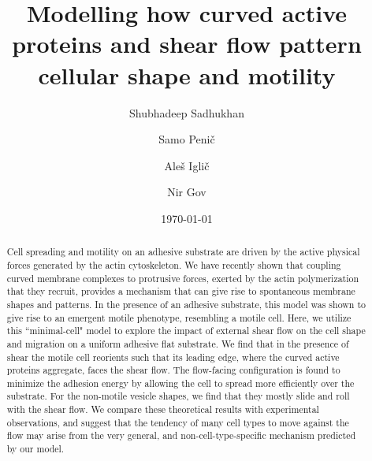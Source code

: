 \documentclass[
reprint,
superscriptaddress,
 amsmath,amssymb,
 aps,
prl,
floatfix]{revtex4-2}
\begin{document}

\title[]{
Modelling how curved active proteins and shear flow pattern cellular shape and motility\\
}

\author{Shubhadeep Sadhukhan}
\author{Samo Peni\v{c}}
\author{Ale\v{s} Igli\v{c}}
\author{Nir Gov}%
\date{\today}

\begin{abstract}
Cell spreading and motility on an adhesive substrate are driven by the active physical forces generated by the actin cytoskeleton. We have recently shown that coupling curved membrane complexes to protrusive forces, exerted by the actin polymerization that they recruit, provides a mechanism that can give rise to spontaneous membrane shapes and patterns. In the presence of an adhesive substrate, this model was shown to give rise to an emergent motile phenotype, resembling a motile cell. Here, we utilize this ``minimal-cell" model to explore the impact of external shear flow on the cell shape and migration on a uniform adhesive flat substrate. We find that in the presence of shear the motile cell reorients such that its leading edge, where the curved active proteins aggregate, faces the shear flow. The flow-facing configuration is found to minimize the adhesion energy by allowing the cell to spread more efficiently over the substrate. For the non-motile vesicle shapes, we find that they mostly slide and roll with the shear flow. We compare these theoretical results with experimental observations, and suggest that the tendency of many cell types to move against the flow may arise from the very general, and non-cell-type-specific mechanism predicted by our model. 
\end{abstract}
\end{document}
